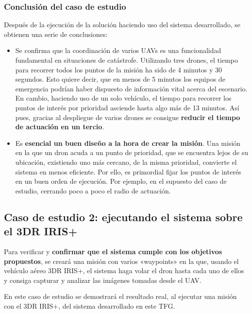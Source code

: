 
\subsubsection{Conclusión del caso de estudio}

Después de la ejecución de la solución haciendo uso del sistema desarrollado, se obtienen una serie de conclusiones:

\begin{itemize}
\item Se confirma que la coordinación de varios \acs{UAV}s es una funcionalidad fundamental en situaciones de catástrofe. Utilizando tres drones, el tiempo para recorrer todos los puntos de la misión ha sido de 4 minutos y 30 segundos. Esto quiere decir, que en menos de 5 minutos los equipos de emergencia podrían haber dispuesto de información vital acerca del escenario. En cambio, haciendo uso de un solo vehículo, el tiempo para recorrer los puntos de interés por prioridad asciende hasta algo más de 13 minutos. Así pues, gracias al despliegue de varios drones se consigue \textbf{reducir el tiempo de actuación en un tercio}.
\item Es \textbf{esencial un buen diseño a la hora de crear la misión}. Una misión en la que un dron acuda a un punto de prioridad, que se encuentra lejos de su ubicación, existiendo uno más cercano, de la misma prioridad, convierte el sistema en menos eficiente. Por ello, es primordial fijar los puntos de interés en un buen orden de ejecución. Por ejemplo, en el supuesto del caso de estudio, cerrando poco a poco el radio de actuación.
\end{itemize}

\clearpage

\subsection{Caso de estudio 2: ejecutando el sistema sobre el 3DR IRIS+}

Para verificar y \textbf{confirmar que el sistema cumple con los objetivos propuestos}, se creará una misión con varios «waypoints» en la que, usando el vehículo aéreo 3DR IRIS+, el sistema haga volar el dron hasta cada uno de ellos y consiga capturar y analizar las imágenes tomadas desde el \acs{UAV}. 

En este caso de estudio se demostrará el resultado real, al ejecutar una misión con el 3DR IRIS+, del sistema desarrollado en este \acs{TFG}.

